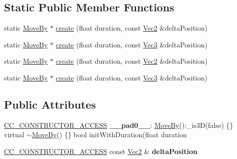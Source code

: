 \subsection*{Static Public Member Functions}
\begin{DoxyCompactItemize}
\item 
static \hyperlink{classMoveBy}{Move\+By} $\ast$ \hyperlink{classMoveBy_a4781fe85da740426582c34276557be5c}{create} (float duration, const \hyperlink{classVec2}{Vec2} \&delta\+Position)
\item 
static \hyperlink{classMoveBy}{Move\+By} $\ast$ \hyperlink{classMoveBy_a01ca68a3098b965f7edbf76da1009f3e}{create} (float duration, const \hyperlink{classVec3}{Vec3} \&delta\+Position)
\item 
static \hyperlink{classMoveBy}{Move\+By} $\ast$ \hyperlink{classMoveBy_a01180b2a61d81859ee785c7232ffbeb9}{create} (float duration, const \hyperlink{classVec2}{Vec2} \&delta\+Position)
\item 
static \hyperlink{classMoveBy}{Move\+By} $\ast$ \hyperlink{classMoveBy_a2c99e020ef5ae6bfd613ca8661f70207}{create} (float duration, const \hyperlink{classVec3}{Vec3} \&delta\+Position)
\end{DoxyCompactItemize}
\subsection*{Public Attributes}
\begin{DoxyCompactItemize}
\item 
\mbox{\label{classMoveBy_a849c2c7a8501ec20026d8f6b7fc300a0}} 
\hyperlink{_2cocos2d_2cocos_2base_2ccConfig_8h_a25ef1314f97c35a2ed3d029b0ead6da0}{C\+C\+\_\+\+C\+O\+N\+S\+T\+R\+U\+C\+T\+O\+R\+\_\+\+A\+C\+C\+E\+SS} {\bfseries \+\_\+\+\_\+pad0\+\_\+\+\_\+}\+: \hyperlink{classMoveBy}{Move\+By}()\+:\+\_\+is3D(false) \{\} virtual $\sim$\hyperlink{classMoveBy}{Move\+By}() \{\} bool init\+With\+Duration(float duration
\item 
\mbox{\label{classMoveBy_a7aa08f011230d1079672cd0b0dd615e8}} 
\hyperlink{_2cocos2d_2cocos_2base_2ccConfig_8h_a25ef1314f97c35a2ed3d029b0ead6da0}{C\+C\+\_\+\+C\+O\+N\+S\+T\+R\+U\+C\+T\+O\+R\+\_\+\+A\+C\+C\+E\+SS} const \hyperlink{classVec2}{Vec2} \& {\bfseries delta\+Position}
\end{DoxyCompactItemize}
